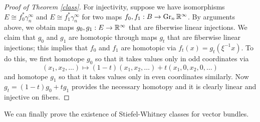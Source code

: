 \documentclass{amsart}
\begin{document}
\begin{proof}[Proof of Theorem \ref{class}]
    For injectivity, suppose we have isomorphisms $E\cong f_0^*\gamma_n^\infty$ and
    $E\cong f_1^*\gamma_n^\infty$ for two maps $f_0,f_1:B\to\operatorname{Gr}_n\mathbb{R}^\infty$. By arguments above,
    we obtain maps $g_0,g_1:E\to\mathbb{R}^\infty$ that are fiberwise linear injections. We claim that
    $g_0$ and $g_1$ are homotopic through maps $g_t$ that are fiberwise linear injections; this
    implies that $f_0$ and $f_1$ are homotopic via $f_t(x)=g_t(\xi^{-1}x)$. To do this, we first
    homotope $g_0$ so that it takes values only in odd coordinates via
    \begin{equation*}
        (x_1,x_2,\ldots) \mapsto (1-t)(x_1,x_2,\ldots)+t(x_1,0,x_2,0,\ldots)
    \end{equation*}
    and homotope $g_1$ so that it takes values only in even coordinates similarly. Now
    $g_t=(1-t)g_0+tg_1$ provides the necessary homotopy and it is clearly linear and injective
    on fibers.
\end{proof}

We can finally prove the existence of Stiefel-Whitney classes for vector bundles.
\end{document}
